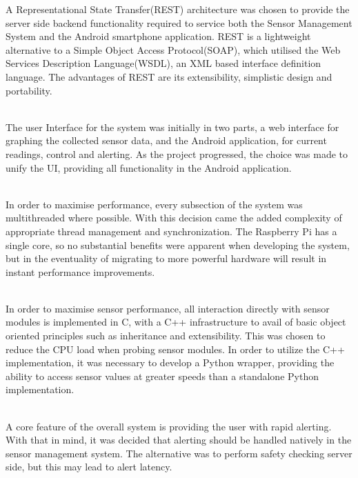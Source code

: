 \documentclass{article}
\begin{document}
A Representational State Transfer(REST) architecture was chosen to provide the server side backend functionality required to service both the Sensor Management System and the Android smartphone application.  REST is a lightweight alternative to a Simple Object Access Protocol(SOAP), which utilised the Web Services Description Language(WSDL), an XML based interface definition language. The advantages of REST are its extensibility, simplistic design and portability. \\\

The user Interface for the system was initially in two parts, a web interface for graphing the collected sensor data, and the Android application, for current readings, control and alerting. As the project progressed, the choice was made to unify the UI, providing all functionality in the Android application.  \\\

In order to maximise performance, every subsection of the system was multithreaded where possible. With this decision came the added complexity of appropriate thread management and synchronization. The Raspberry Pi has a single core, so no substantial benefits were apparent when developing the system, but in the eventuality of migrating to more powerful hardware will result in instant performance improvements. \\\

In order to maximise sensor performance, all interaction directly with sensor modules is implemented in C, with a C++ infrastructure to avail of basic object oriented principles such as inheritance and extensibility. This was chosen to reduce the CPU load when probing sensor modules. In order to utilize the C++ implementation, it was necessary to develop a Python wrapper, providing the ability to access sensor values at greater speeds than a standalone Python implementation. \\\

A core feature of the overall system is providing the user with rapid alerting. With that in mind, it was decided that alerting should be handled natively in the sensor management system. The alternative was to perform safety checking server side, but this may lead to alert latency. \\\
\end{document}
